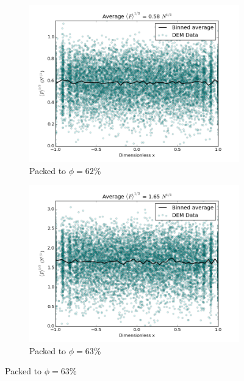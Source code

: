 \begin{figure}[!ht]
	\centering
	\begin{subfigure}[b]{0.4\textwidth}
		\centering
		\includegraphics[width=\textwidth]{chapters/figures/initial_packing_study/62-deform-force-profile.png}
		\caption{Packed to $\phi = 62$\%}
	\end{subfigure}
	
	\begin{subfigure}[b]{0.4\textwidth}
		\centering
		\includegraphics[width=\textwidth]{chapters/figures/initial_packing_study/63-deform-force-profile.png}
		\caption{Packed to $\phi = 63$\%}
	\end{subfigure}


\end{figure}

